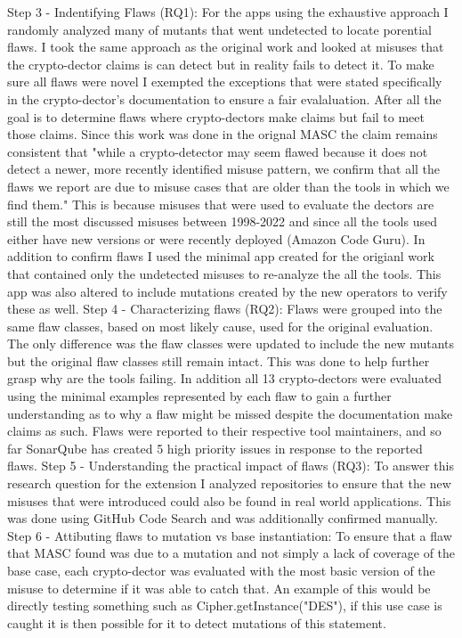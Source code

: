 Step 3 - Indentifying Flaws (RQ1): For the apps using the exhaustive approach I randomly analyzed many of mutants that went undetected to locate porential flaws. I took the same approach as the original work and looked at misuses that the crypto-dector claims is can detect but in reality fails to detect it. To make sure all flaws were novel I exempted the exceptions that were stated specifically in the crypto-dector's documentation to ensure a fair evalaluation. After all the goal is to determine flaws where crypto-dectors make claims but fail to meet those claims. Since this work was done in the orignal MASC the claim remains consistent that "while a crypto-detector may seem flawed because it does not detect a newer, more recently identified misuse pattern, we confirm that all the flaws we report are due to misuse cases that are older than the tools in which we find them." This is because misuses that were used to evaluate the dectors are still the most discussed misuses between 1998-2022 and since all the tools used either have new versions or were recently deployed (Amazon Code Guru). In addition to confirm flaws I used the minimal app created for the origianl work that contained only the undetected misuses to re-analyze the all the tools. This app was also altered to include mutations created by the new operators to verify these as well.
Step 4 - Characterizing flaws (RQ2): Flaws were grouped into the same flaw classes, based on most likely cause, used for the original evaluation. The only difference was the flaw classes were updated to include the new mutants but the original flaw classes still remain intact. This was done to help further grasp why are the tools failing. In addition all 13 crypto-dectors were evaluated using the minimal examples represented by each flaw to gain a further understanding as to why a flaw might be missed despite the documentation make claims as such. Flaws were reported to their respective tool maintainers, and so far SonarQube has created 5 high priority issues in response to the reported flaws.
Step 5 - Understanding the practical impact of flaws (RQ3): To answer this research question for the extension I analyzed repositories to ensure that the new misuses that were introduced could also be found in real world applications. This was done using GitHub Code Search and was additionally confirmed manually.
Step 6 - Attibuting flaws to mutation vs base instantiation: To ensure that a flaw that MASC found was due to a mutation and not simply a lack of coverage of the base case, each crypto-dector was evaluated with the most basic version of the misuse to determine if it was able to catch that. An example of this would be directly testing something such as Cipher.getInstance("DES"), if this use case is caught it is then possible for it to detect mutations of this statement.
